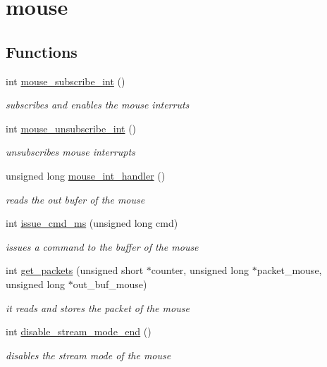 \hypertarget{group__mouse}{}\section{mouse}
\label{group__mouse}
\subsection*{Functions}
\begin{DoxyCompactItemize}
\item 
int \hyperlink{group__mouse_ga99506573209b197b84ee22a228b89fbd}{mouse\+\_\+subscribe\+\_\+int} ()
\begin{DoxyCompactList}\small\item\em subscribes and enables the mouse interruts \end{DoxyCompactList}\item 
int \hyperlink{group__mouse_ga685ad2706aca36d9869a30a19b9f446a}{mouse\+\_\+unsubscribe\+\_\+int} ()
\begin{DoxyCompactList}\small\item\em unsubscribes mouse interrupts \end{DoxyCompactList}\item 
unsigned long \hyperlink{group__mouse_ga45c719d8de1147830bd478d4b0e47b97}{mouse\+\_\+int\+\_\+handler} ()
\begin{DoxyCompactList}\small\item\em reads the out bufer of the mouse \end{DoxyCompactList}\item 
int \hyperlink{group__mouse_ga264805a6ca2c11cf80a5e18741400e33}{issue\+\_\+cmd\+\_\+ms} (unsigned long cmd)
\begin{DoxyCompactList}\small\item\em issues a command to the buffer of the mouse \end{DoxyCompactList}\item 
int \hyperlink{group__mouse_ga9bed3f8254b40f5c02cca1cab0551be7}{get\+\_\+packets} (unsigned short $\ast$counter, unsigned long $\ast$packet\+\_\+mouse, unsigned long $\ast$out\+\_\+buf\+\_\+mouse)
\begin{DoxyCompactList}\small\item\em it reads and stores the packet of the mouse \end{DoxyCompactList}\item 
int \hyperlink{group__mouse_gaf578f6a923fae48268dc84dbe1d85c9e}{disable\+\_\+stream\+\_\+mode\+\_\+end} ()
\begin{DoxyCompactList}\small\item\em disables the stream mode of the mouse \end{DoxyCompactList}\item 

\end{DoxyCompactItemize}
